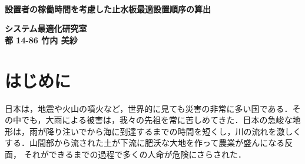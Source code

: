 \documentclass[a4paper,12pt,fleqn]{jarticle}
\begin{document}
\pagestyle{empty}
\begin{center}
 \ \\
 \vspace{8cm}
 \begin{Large}
    {\bf 設置者の稼働時間を考慮した止水板最適設置順序の算出}\\
 \end{Large}
 \vspace{2cm}
 \begin{large}
  {\bf システム最適化研究室} \\
  {\bf 都 14-86 竹内  美紗}
 \end{large}
\end{center}


\newpage
\pagestyle{plain}
\tableofcontents

\newpage
{}
\section{はじめに}

日本は，地震や火山の噴火など，世界的に見ても災害の非常に多い国である．そ
の中でも，大雨による被害は，我々の先祖を常に苦しめてきた．日本の急峻な地
形は，雨が降り注いでから海に到達するまでの時間を短くし，川の流れを激しく
する．山間部から流された土が下流に肥沃な大地を作って農業が盛んになる反面，
それができるまでの過程で多くの人命が危険にさらされた．
\end{document}
